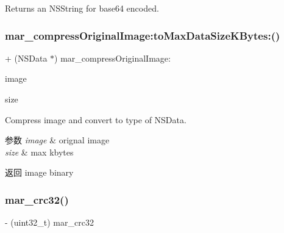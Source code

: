 Returns an N\+S\+String for base64 encoded. \mbox{\label{category_n_s_data_07_m_a_r_e_x_08_af0e50e8467f9065c6a2da6f372d04ceb}} 
\subsubsection{\texorpdfstring{mar\+\_\+compress\+Original\+Image\+:to\+Max\+Data\+Size\+K\+Bytes\+:()}{mar\_compressOriginalImage:toMaxDataSizeKBytes:()}}
{\footnotesize\ttfamily + (N\+S\+Data $\ast$) mar\+\_\+compress\+Original\+Image\+: \begin{DoxyParamCaption}\item[{(U\+I\+Image $\ast$)}]{image }\item[{toMaxDataSizeKBytes:(C\+G\+Float)}]{size }\end{DoxyParamCaption}}

Compress image and convert to type of N\+S\+Data.


\begin{DoxyParams}{参数}
{\em image} & orignal image \\
\hline
{\em size} & max kbytes \\
\hline
\end{DoxyParams}
\begin{DoxyReturn}{返回}
image binary 
\end{DoxyReturn}
\mbox{\label{category_n_s_data_07_m_a_r_e_x_08_aae0068b0e14781bf7496e16894d2ceb2}} 
\subsubsection{\texorpdfstring{mar\+\_\+crc32()}{mar\_crc32()}}
{\footnotesize\ttfamily -\/ (uint32\+\_\+t) mar\+\_\+crc32 \begin{DoxyParamCaption}{ }\end{DoxyParamCaption}}

